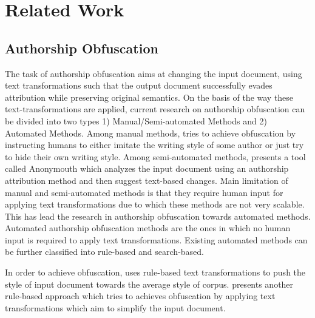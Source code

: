 \section{Related Work}


\subsection{Authorship Obfuscation}
The task of authorship obfuscation aims at changing the input document, using text transformations such that the output document successfully evades attribution while preserving original semantics.
%
On the basis of the way these text-transformations are applied, current research on authorship obfuscation can be divided into two types 1) Manual/Semi-automated Methods and 2) Automated Methods.
Among manual methods, \cite{brennan2012adversarial} tries to achieve obfuscation by instructing humans to either imitate the writing style of some author or just try to hide their own writing style.
%
Among semi-automated methods, \cite{mcdonald2012use} presents a tool called Anonymouth which analyzes the input document using an authorship attribution method and then suggest text-based changes.
%
%
Main limitation of manual and semi-automated methods is that they require human input for applying text transformations due to which these methods are not very scalable.
%
This has lead the research in authorship obfuscation towards automated methods.
%
Automated authorship obfuscation methods are the ones in which no human input is required to apply text transformations.
%
%
Existing automated methods can be further classified into rule-based and search-based.

In order to achieve obfuscation, \cite{karadzhov2017case} uses rule-based text transformations to push the style of input document towards the average style of corpus.
%
%
\cite{castro2017author} presents another rule-based approach which tries to achieves obfuscation by applying text transformations which aim to simplify the input document.


